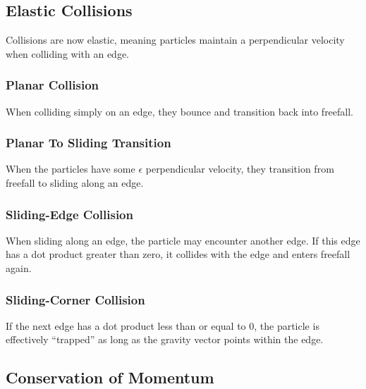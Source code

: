 	\subsection{Elastic Collisions}

	Collisions are now elastic, meaning particles maintain a perpendicular velocity when colliding with an edge.

		\subsubsection{Planar Collision}

		When colliding simply on an edge, they bounce and transition back into freefall.


		\subsubsection{Planar To Sliding Transition}

		When the particles have some $\epsilon$ perpendicular velocity, they transition from freefall to sliding along an edge.


		\subsubsection{Sliding-Edge Collision}

		When sliding along an edge, the particle may encounter another edge. If this edge has a dot product greater than zero, it collides with the edge and enters freefall again.


		\subsubsection{Sliding-Corner Collision}

		If the next edge has a dot product less than or equal to 0, the particle is effectively ``trapped'' as long as the gravity vector points within the edge.


	\subsection{Conservation of Momentum}

